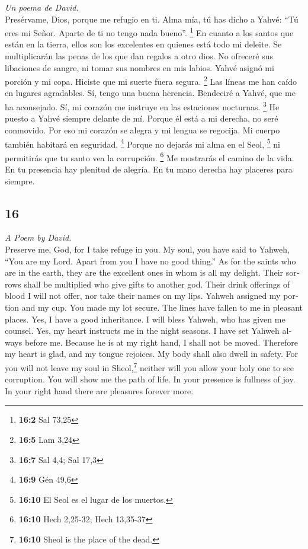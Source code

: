 \begin{paracol}{2}
\emph{Un poema de David.}\\
 Presérvame, Dios, porque me refugio en ti. 
Alma mía, tú has dicho a Yahvé: ``Tú eres mi Señor. Aparte de ti no
tengo nada bueno''. \footnote{\textbf{16:2} Sal 73,25}  En
cuanto a los santos que están en la tierra, ellos son los excelentes en
quienes está todo mi deleite.  Se multiplicarán las penas
de los que dan regalos a otro dios. No ofreceré sus libaciones de
sangre, ni tomar sus nombres en mis labios.  Yahvé asignó
mi porción y mi copa. Hiciste que mi suerte fuera segura. \footnote{\textbf{16:5}
  Lam 3,24}  Las líneas me han caído en lugares
agradables. Sí, tengo una buena herencia.  Bendeciré a
Yahvé, que me ha aconsejado. Sí, mi corazón me instruye en las
estaciones nocturnas. \footnote{\textbf{16:7} Sal 4,4; Sal 17,3}
 He puesto a Yahvé siempre delante de mí. Porque él está a
mi derecha, no seré conmovido.  Por eso mi corazón se
alegra y mi lengua se regocija. Mi cuerpo también habitará en seguridad.
\footnote{\textbf{16:9} Gén 49,6}  Porque no dejarás mi
alma en el Seol, \footnote{\textbf{16:10} El Seol es el lugar de los
  muertos.} ni permitirás que tu santo vea la corrupción. \footnote{\textbf{16:10}
  Hech 2,25-32; Hech 13,35-37}  Me mostrarás el camino de
la vida. En tu presencia hay plenitud de alegría. En tu mano derecha hay
placeres para siempre.

\switchcolumn
\begin{otherlanguage}{english}

\hypertarget{section-31}{%
\section{16}\label{section-31}}

\emph{A Poem by David.}\\
 Preserve me, God, for I take refuge in you.
 My soul, you have said to Yahweh, ``You are my Lord.
Apart from you I have no good thing.''  As for the saints
who are in the earth, they are the excellent ones in whom is all my
delight.  Their sorrows shall be multiplied who give gifts
to another god. Their drink offerings of blood I will not offer, nor
take their names on my lips.  Yahweh assigned my portion
and my cup. You made my lot secure.  The lines have fallen
to me in pleasant places. Yes, I have a good inheritance. 
I will bless Yahweh, who has given me counsel. Yes, my heart instructs
me in the night seasons.  I have set Yahweh always before
me. Because he is at my right hand, I shall not be moved. 
Therefore my heart is glad, and my tongue rejoices. My body shall also
dwell in safety.  For you will not leave my soul in
Sheol,\footnote{\textbf{16:10} Sheol is the place of the dead.} neither
will you allow your holy one to see corruption.  You will
show me the path of life. In your presence is fullness of joy. In your
right hand there are pleasures forever more.


\end{otherlanguage}
\end{paracol}
